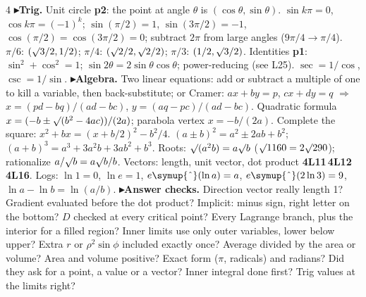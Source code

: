\documentclass{article}
\newcommand\stamplines{9}      %
\newcommand\cx{\mathord{\symup{\char"5E}}}                               %
\newcommand\sh[1]{{\setlength\fboxsep{0.18pt}\colorbox{black!22}{\textbf{#1}}}}  %
\newcommand\pt[1]{\textbf{{\symf ▸}#1}}       %
\newcommand\rt{\smash{\surd}}                  %
\newcommand\then{\ensuremath{\Rightarrow}}
\begin{document}
\begin{multicols*}{4}
\pt{Trig.} Unit circle \sh{p2}: the point at angle $\theta$ is $(\cos\theta,\sin\theta)$. $\sin k\pi=0$, $\cos k\pi=(-1)^k$; $\sin(\pi/2)=1$, $\sin(3\pi/2)=-1$, $\cos(\pi/2)=\cos(3\pi/2)=0$; subtract $2\pi$ from large angles ($9\pi/4\to\pi/4$). $\pi/6$: $(\rt3/2,1/2)$; $\pi/4$: $(\rt2/2,\rt2/2)$; $\pi/3$: $(1/2,\rt3/2)$. Identities \sh{p1}: $\sin^2+\cos^2=1$; $\sin2\theta=2\sin\theta\cos\theta$; power-reducing (see L25). $\sec=1/\cos$, $\csc=1/\sin$.
\pt{Algebra.} Two linear equations: add or subtract a multiple of one to kill a variable, then back-substitute; or Cramer: $ax+by=p$, $cx+dy=q$ \then\ $x=(pd-bq)/(ad-bc)$, $y=(aq-pc)/(ad-bc)$. Quadratic formula $x=(-b\pm\rt(b^2-4ac))/(2a)$; parabola vertex $x=-b/(2a)$. Complete the square: $x^2+bx=(x+b/2)^2-b^2/4$. $(a\pm b)^2=a^2\pm2ab+b^2$; $(a+b)^3=a^3+3a^2b+3ab^2+b^3$. Roots: $\rt(a^2b)=a\rt b$ ($\rt1160=2\rt290$); rationalize $a/\rt b=a\rt b/b$. Vectors: length, unit vector, dot product \sh{4L11}\,\sh{4L12}\,\sh{4L16}. Logs: $\ln1=0$, $\ln e=1$, $e\cx(\ln a)=a$, $e\cx(2\ln3)=9$, $\ln a-\ln b=\ln(a/b)$.
\pt{Answer checks.} Direction vector really length 1? Gradient evaluated before the dot product? Implicit: minus sign, right letter on the bottom? $D$ checked at every critical point? Every Lagrange branch, plus the interior for a filled region? Inner limits use only outer variables, lower below upper? Extra $r$ or $\rho^2\sin\phi$ included exactly once? Average divided by the area or volume? Area and volume positive? Exact form ($\pi$, radicals) and radians? Did they ask for a point, a value or a vector? Inner integral done first? Trig values at the limits right?

\vfill
\noindent\hfil\resizebox{!}{\dimexpr\stamplines\pitch-3.4pt\relax}{\vbox{\special{pdf:bc [1] [0]}\stampf\fontsize{20}{20}\selectfont
  \baselineskip=0pt \lineskiplimit=0pt \lineskip=2.6pt
  \halign{\hfil#\hfil\cr STAMP\cr HERE\cr}\special{pdf:ec}}}\hfil\par\kern1pt

\end{multicols*}
\end{document}
